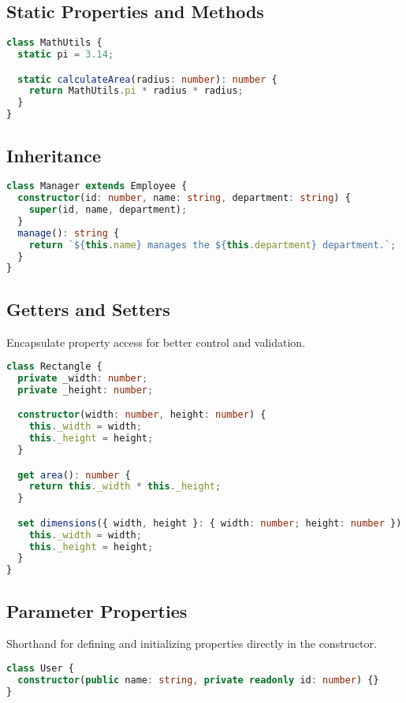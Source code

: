 \documentclass[a4paper,12pt]{article}
\begin{document}
\subsection*{Static Properties and Methods}
\begin{lstlisting}[language=TypeScript]
class MathUtils {
  static pi = 3.14;

  static calculateArea(radius: number): number {
    return MathUtils.pi * radius * radius;
  }
}
\end{lstlisting}

\subsection*{Inheritance}
\begin{lstlisting}[language=TypeScript]
class Manager extends Employee {
  constructor(id: number, name: string, department: string) {
    super(id, name, department);
  }
  manage(): string {
    return `${this.name} manages the ${this.department} department.`;
  }
}
\end{lstlisting}

\subsection*{Getters and Setters}
Encapsulate property access for better control and validation.

\begin{lstlisting}[language=TypeScript]
class Rectangle {
  private _width: number;
  private _height: number;

  constructor(width: number, height: number) {
    this._width = width;
    this._height = height;
  }

  get area(): number {
    return this._width * this._height;
  }

  set dimensions({ width, height }: { width: number; height: number }) {
    this._width = width;
    this._height = height;
  }
}
\end{lstlisting}

\subsection*{Parameter Properties}
Shorthand for defining and initializing properties directly in the constructor.

\begin{lstlisting}[language=TypeScript]
class User {
  constructor(public name: string, private readonly id: number) {}
}
\end{lstlisting}
\end{document}
